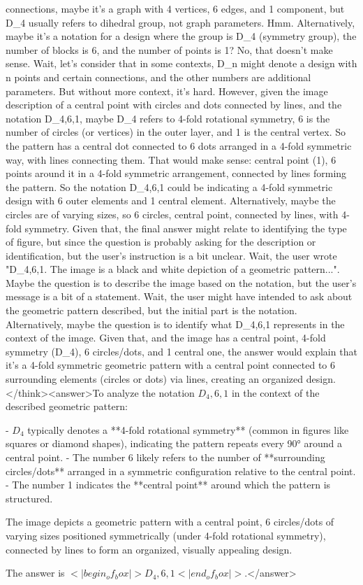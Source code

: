 connections, maybe it's a graph with 4 vertices, 6 edges, and 1 component, but D_4 usually refers to dihedral group, not graph parameters. Hmm. Alternatively, maybe it's a notation for a design where the group is D_4 (symmetry group), the number of blocks is 6, and the number of points is 1? No, that doesn't make sense. Wait, let's consider that in some contexts, D_n might denote a design with n points and certain connections, and the other numbers are additional parameters. But without more context, it's hard. However, given the image description of a central point with circles and dots connected by lines, and the notation D_4,6,1, maybe D_4 refers to 4-fold rotational symmetry, 6 is the number of circles (or vertices) in the outer layer, and 1 is the central vertex. So the pattern has a central dot connected to 6 dots arranged in a 4-fold symmetric way, with lines connecting them. That would make sense: central point (1), 6 points around it in a 4-fold symmetric arrangement, connected by lines forming the pattern. So the notation D_4,6,1 could be indicating a 4-fold symmetric design with 6 outer elements and 1 central element. Alternatively, maybe the circles are of varying sizes, so 6 circles, central point, connected by lines, with 4-fold symmetry. Given that, the final answer might relate to identifying the type of figure, but since the question is probably asking for the description or identification, but the user's instruction is a bit unclear. Wait, the user wrote "D_4,6,1. The image is a black and white depiction of a geometric pattern...". Maybe the question is to describe the image based on the notation, but the user's message is a bit of a statement. Wait, the user might have intended to ask about the geometric pattern described, but the initial part is the notation. Alternatively, maybe the question is to identify what D_4,6,1 represents in the context of the image. Given that, and the image has a central point, 4-fold symmetry (D_4), 6 circles/dots, and 1 central one, the answer would explain that it's a 4-fold symmetric geometric pattern with a central point connected to 6 surrounding elements (circles or dots) via lines, creating an organized design.</think><answer>To analyze the notation \( D_4,6,1 \) in the context of the described geometric pattern:  

- \( D_4 \) typically denotes a **4-fold rotational symmetry** (common in figures like squares or diamond shapes), indicating the pattern repeats every 90° around a central point.  
- The number 6 likely refers to the number of **surrounding circles/dots** arranged in a symmetric configuration relative to the central point.  
- The number 1 indicates the **central point** around which the pattern is structured.  

The image depicts a geometric pattern with a central point, 6 circles/dots of varying sizes positioned symmetrically (under 4-fold rotational symmetry), connected by lines to form an organized, visually appealing design.  

The answer is \(<|begin_of_box|>D_4,6,1<|end_of_box|>\).</answer>